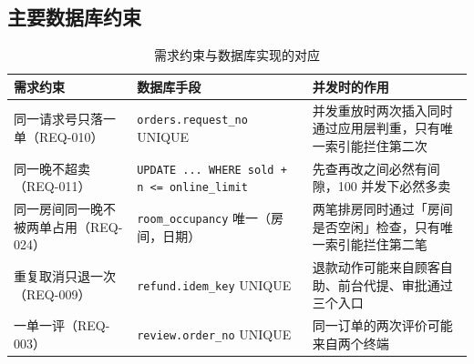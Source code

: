 \subsection{主要数据库约束}

\begin{table}[H]
\centering
\caption{需求约束与数据库实现的对应}
\tabfont
\begin{tabularx}{\textwidth}{@{}p{3.4cm}p{3.6cm}X@{}}
\toprule
需求约束 & 数据库手段 & 并发时的作用 \\
\midrule
同一请求号只落一单（REQ-010） & \texttt{orders.request\_no} UNIQUE & 并发重放时两次插入同时通过应用层判重，只有唯一索引能拦住第二次 \\
同一晚不超卖（REQ-011） & \texttt{UPDATE ... WHERE sold + n <= online\_limit} & 先查再改之间必然有间隙，100 并发下必然多卖 \\
同一房间同一晚不被两单占用（REQ-024） & \texttt{room\_occupancy} 唯一（房间，日期） & 两笔排房同时通过「房间是否空闲」检查，只有唯一索引能拦住第二笔 \\
重复取消只退一次（REQ-009） & \texttt{refund.idem\_key} UNIQUE & 退款动作可能来自顾客自助、前台代提、审批通过三个入口 \\
一单一评（REQ-003） & \texttt{review.order\_no} UNIQUE & 同一订单的两次评价可能来自两个终端 \\
\bottomrule
\end{tabularx}
\end{table}
